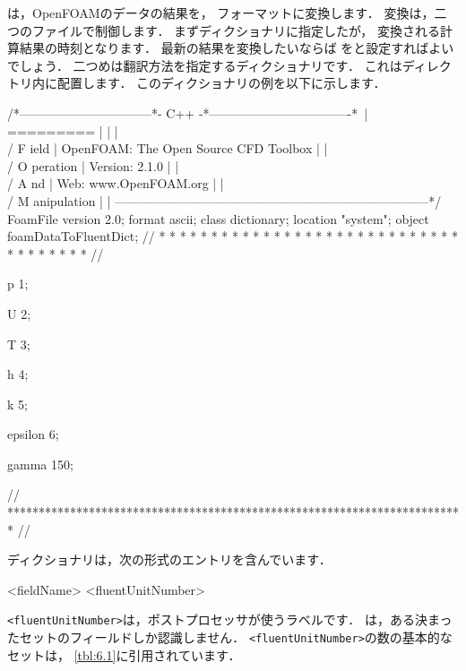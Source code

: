 は，OpenFOAMのデータの結果を，
フォーマットに変換します．
変換は，二つのファイルで制御します．
まずディクショナリに指定したが，
変換される計算結果の時刻となります．
最新の結果を変換したいならば
をと設定すればよいでしょう．
二つめは翻訳方法を指定するディクショナリです．
これはディレクトリ内に配置します．
このディクショナリの例を以下に示します．
\begin{OFverbatim}
/*--------------------------------*- C++ -*----------------------------------*\
| =========                 |                                                 |
| \\      /  F ield         | OpenFOAM: The Open Source CFD Toolbox           |
|  \\    /   O peration     | Version:  2.1.0                                 |
|   \\  /    A nd           | Web:      www.OpenFOAM.org                      |
|    \\/     M anipulation  |                                                 |
\*---------------------------------------------------------------------------*/
FoamFile
{
    version    2.0;
    format     ascii;
    class      dictionary;
    location   "system";
    object     foamDataToFluentDict;
}
// * * * * * * * * * * * * * * * * * * * * * * * * * * * * * * * * * * * * * //

p               1;

U               2;

T               3;

h               4;

k               5;

epsilon         6;

gamma           150;


// ************************************************************************* //
\end{OFverbatim}
ディクショナリは，次の形式のエントリを含んでいます．
\begin{OFverbatim}[file]
<fieldName> <fluentUnitNumber>
\end{OFverbatim}
\verb|<fluentUnitNumber>|は，ポストプロセッサが使うラベルです．
\OFthirdparty{Fluent}は，ある決まったセットのフィールドしか認識しません．
\verb|<fluentUnitNumber>|の数の基本的なセットは，
\autoref{tbl:6.1}に引用されています．


